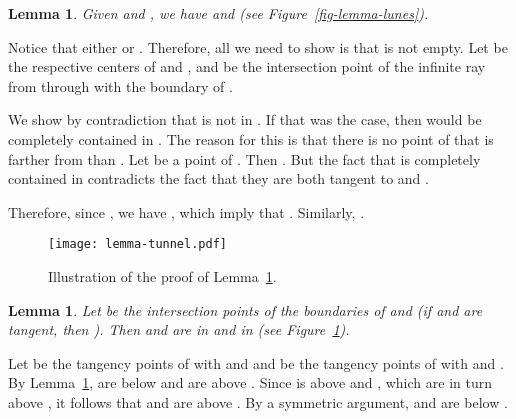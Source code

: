 \documentclass[pdftex,leqno,fleqn,12pt]{article}
\newtheorem{lemma}[theorem]{Lemma}
\newenvironment{proof}{{\textit Proof:} \rm}{\hfill  \medskip\\}
\begin{document}
\begin{lemma}\label{lemma-lunes}  Given  and , we have  and
 (see Figure~\ref{fig-lemma-lunes}).
\end{lemma}
\begin{proof}
Notice that either  or . Therefore, all we need to show is that  is not empty. Let  be the respective centers of  and ,
and  be the intersection point of the infinite ray from  through  with the boundary of
.

We show by contradiction that  is not in . If that was the case, then  would be
completely contained in . The reason for this is that there is no point of  that is
farther from  than . Let  be a point of . Then . But the fact that  is completely contained in  contradicts
the fact that they are both tangent to  and .

Therefore, since , we have ,
which imply that . Similarly, .
\end{proof}

\begin{figure}
\centering
\texttt{[image: lemma-tunnel.pdf]}\caption{Illustration of the proof of Lemma~\ref{lemma-tunnel}.}\label{fig-lemma-tunnel}
\end{figure}

\begin{lemma}\label{lemma-tunnel}
Let  be the intersection points of the boundaries of  and  (if 
and  are tangent, then ). Then  and  are in  and in 
(see Figure~\ref{fig-lemma-tunnel}).
\end{lemma}
\begin{proof}
Let  be the tangency points of  with  and  and  be the tangency
points of  with  and . By Lemma~\ref{lemma-lunes},  are below  and
 are above . Since  is above  and , which are in turn above
, it follows that  and  are above . By a symmetric argument,  and
 are below .
\end{proof}
\end{document}
